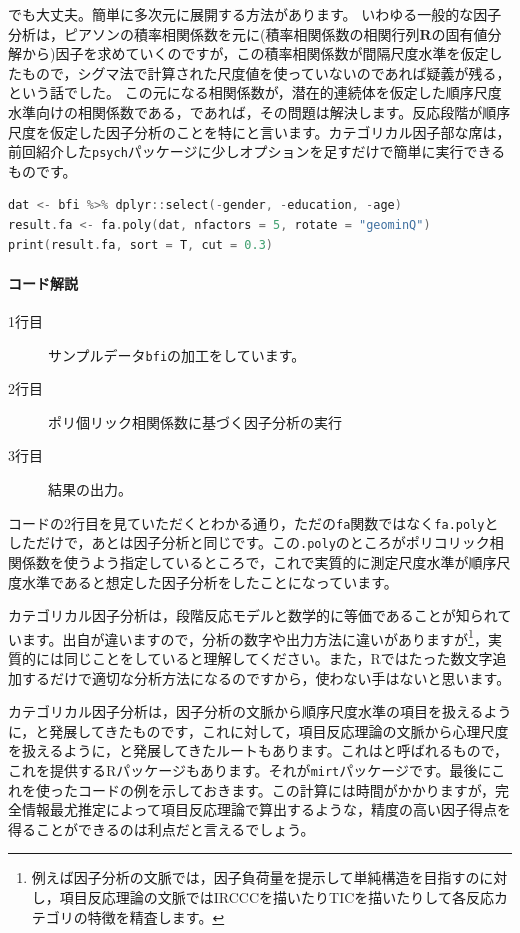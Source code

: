 \documentclass{ltjsbook}
\begin{document}
でも大丈夫。簡単に多次元に展開する方法があります。
いわゆる一般的な因子分析は，ピアソンの積率相関係数を元に(積率相関係数の相関行列$\bm{R}$の固有値分解から)因子を求めていくのですが，この積率相関係数が間隔尺度水準を仮定したもので，シグマ法で計算された尺度値を使っていないのであれば疑義が残る，という話でした。
この元になる相関係数が，潜在的連続体を仮定した順序尺度水準向けの相関係数である，であれば，その問題は解決します。反応段階が順序尺度を仮定した因子分析のことを特にと言います。カテゴリカル因子部な席は，前回紹介した\texttt{psych}パッケージに少しオプションを足すだけで簡単に実行できるものです。

\begin{lstlisting}[language=c++,label={code::11_05},caption={GRMの実行}]
dat <- bfi %>% dplyr::select(-gender, -education, -age)
result.fa <- fa.poly(dat, nfactors = 5, rotate = "geominQ")
print(result.fa, sort = T, cut = 0.3)
\end{lstlisting}

\paragraph{コード解説}
\begin{description}
        \item[1行目] サンプルデータ\texttt{bfi}の加工をしています。
        \item[2行目] ポリ個リック相関係数に基づく因子分析の実行
        \item[3行目] 結果の出力。
\end{description}

コードの2行目を見ていただくとわかる通り，ただの\texttt{fa}関数ではなく\texttt{fa.poly}としただけで，あとは因子分析と同じです。この\texttt{.poly}のところがポリコリック相関係数を使うよう指定しているところで，これで実質的に測定尺度水準が順序尺度水準であると想定した因子分析をしたことになっています。

カテゴリカル因子分析は，段階反応モデルと数学的に等価であることが知られています。出自が違いますので，分析の数字や出力方法に違いがありますが\footnote{例えば因子分析の文脈では，因子負荷量を提示して単純構造を目指すのに対し，項目反応理論の文脈ではIRCCCを描いたりTICを描いたりして各反応カテゴリの特徴を精査します。}，実質的には同じことをしていると理解してください。また，Rではたった数文字追加するだけで適切な分析方法になるのですから，使わない手はないと思います。

カテゴリカル因子分析は，因子分析の文脈から順序尺度水準の項目を扱えるように，と発展してきたものです，これに対して，項目反応理論の文脈から心理尺度を扱えるように，と発展してきたルートもあります。これはと呼ばれるもので，これを提供するRパッケージもあります。それが\texttt{mirt}パッケージ\citep{mirt}です。最後にこれを使ったコードの例を示しておきます。この計算には時間がかかりますが，完全情報最尤推定によって項目反応理論で算出するような，精度の高い因子得点を得ることができるのは利点だと言えるでしょう。
\end{document}
